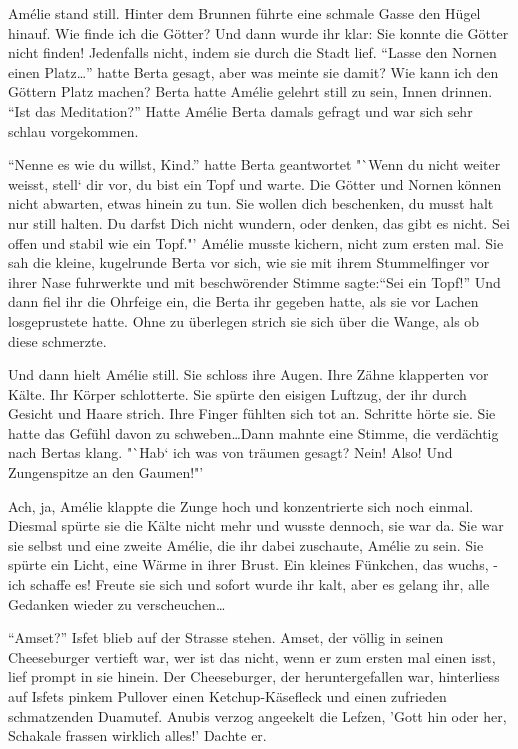 \documentclass[11pt,titlepage,a5paper]{book}
\begin{document}
Amélie stand still. Hinter dem Brunnen führte eine schmale Gasse den Hügel hinauf. Wie finde ich die Götter? Und dann wurde ihr klar: Sie konnte die Götter nicht finden! Jedenfalls nicht, indem sie durch die Stadt lief. "`Lasse den Nornen einen Platz\dots"' hatte Berta gesagt, aber was meinte sie damit? Wie kann ich den Göttern Platz machen? Berta hatte Amélie gelehrt still zu sein, Innen drinnen. "`Ist das Meditation?"' Hatte Amélie Berta damals gefragt und war sich sehr schlau vorgekommen. 

"`Nenne es wie du willst, Kind."' hatte Berta geantwortet "`Wenn du nicht weiter weisst, stell` dir vor, du bist ein Topf und warte. Die Götter und Nornen können nicht abwarten, etwas hinein zu tun. Sie wollen dich beschenken, du musst halt nur still halten. Du darfst Dich nicht wundern, oder denken, das gibt es nicht. Sei offen und stabil wie ein Topf."' Amélie musste kichern, nicht zum ersten mal. Sie sah die kleine, kugelrunde Berta vor sich, wie sie mit ihrem Stummelfinger vor ihrer Nase fuhrwerkte und mit beschwörender Stimme sagte:"`Sei ein Topf!"' Und dann fiel ihr die Ohrfeige ein, die Berta ihr gegeben hatte, als sie vor Lachen losgeprustete hatte. Ohne zu überlegen strich sie sich über die Wange, als ob diese schmerzte.

Und dann hielt Amélie still. Sie schloss ihre Augen. Ihre Zähne klapperten vor Kälte. Ihr Körper schlotterte. Sie spürte den eisigen Luftzug, der ihr durch Gesicht und Haare strich. Ihre Finger fühlten sich tot an. Schritte hörte sie. Sie hatte das Gefühl davon zu schweben\dots Dann mahnte eine Stimme, die verdächtig nach Bertas klang. "`Hab` ich was von träumen gesagt? Nein! Also! Und Zungenspitze an den Gaumen!"'

 Ach, ja, Amélie klappte die Zunge hoch und konzentrierte sich noch einmal. Diesmal spürte sie die Kälte nicht mehr und wusste dennoch, sie war da. Sie war sie selbst und eine zweite Amélie, die ihr dabei zuschaute, Amélie zu sein. Sie spürte ein Licht, eine Wärme in ihrer Brust. Ein kleines Fünkchen, das wuchs, -ich schaffe es! Freute sie sich und sofort wurde ihr kalt, aber es gelang ihr, alle Gedanken wieder zu verscheuchen\dots

"`Amset?"' Isfet blieb auf der Strasse stehen. Amset, der völlig in seinen Cheeseburger vertieft war, wer ist das nicht, wenn er zum ersten mal einen isst, lief prompt in sie hinein. Der Cheeseburger, der heruntergefallen war, hinterliess auf Isfets pinkem Pullover einen Ketchup-Käsefleck und einen zufrieden schmatzenden Duamutef. Anubis verzog angeekelt die Lefzen, 'Gott hin oder her, Schakale frassen wirklich alles!' Dachte er.
\end{document}
